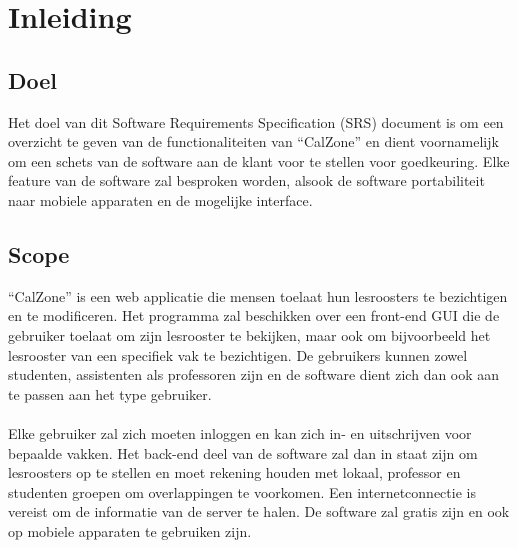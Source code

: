 \chapter{Inleiding}
\section{Doel}
Het doel van dit Software Requirements Specification (SRS) document is om een overzicht te geven van de functionaliteiten van “CalZone” en dient voornamelijk om een schets van de software aan de klant voor te stellen voor goedkeuring. 
Elke feature van de software zal besproken worden, alsook de software portabiliteit naar mobiele apparaten en de mogelijke interface.

\section{Scope}
“CalZone” is een web applicatie die mensen toelaat hun lesroosters te bezichtigen en te modificeren. 
Het programma zal beschikken over een front-end GUI die de gebruiker toelaat om zijn lesrooster te bekijken, maar ook om bijvoorbeeld het lesrooster van een specifiek vak te bezichtigen. 
De gebruikers kunnen zowel studenten, assistenten als professoren zijn en de software dient zich dan ook aan te passen aan het type gebruiker. 
\\
\\
Elke gebruiker zal zich moeten inloggen en kan zich in- en uitschrijven voor bepaalde vakken. 
Het back-end deel van de software zal dan in staat zijn om lesroosters op te stellen en moet rekening houden met lokaal, professor en studenten groepen om overlappingen te voorkomen. 
Een internetconnectie is vereist om de informatie van de server te halen. 
De software zal gratis zijn en ook op mobiele apparaten te gebruiken zijn.
